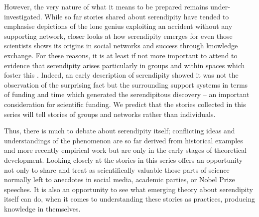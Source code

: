 \documentclass[authordate, empirical]{jote-new-article}
\begin{document}
	However, the very nature of what it means to be prepared remains under-investigated. While so far stories shared about serendipity have tended to emphasise depictions of the lone genius exploiting an accident without any supporting network, closer looks at how serendipity emerges for even those scientists shows its origins in social networks and success through knowledge exchange. For these reasons, it is at least if not more important to attend to evidence that serendipity arises particularly in groups and within spaces which foster this \parencites{Darbellay2014}{McCulloch2021}. Indeed, an early description of serendipity \parencites{Barber1958} showed it was not the observation of the surprising fact but the surrounding support systems in terms of funding and time which generated the serendipitous discovery -- an important consideration for scientific funding. We predict that the stories collected in this series will tell stories of groups and networks rather than individuals.



	Thus, there is much to debate about serendipity itself; conflicting ideas and understandings of the phenomenon are so far derived from historical examples and more recently empirical work but are only in the early stages of theoretical development. Looking closely at the stories in this series offers an opportunity not only to share and treat as scientifically valuable those parts of science normally left to anecdotes in social media, academic parties, or Nobel Prize speeches. It is also an opportunity to see what emerging theory about serendipity itself can do, when it comes to understanding these stories as practices, producing knowledge in themselves.





\printbibliography
\end{document}
